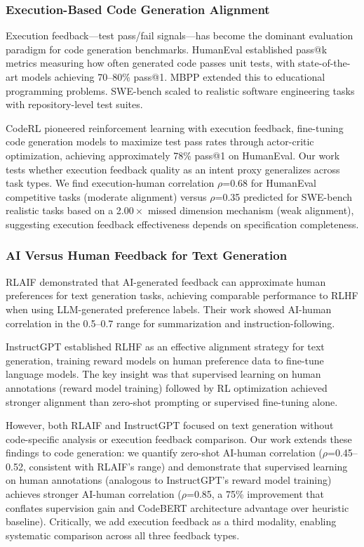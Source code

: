 
\subsubsection{Execution-Based Code Generation Alignment}

Execution feedback---test pass/fail signals---has become the dominant evaluation paradigm for code generation benchmarks. HumanEval \citep{chen2021evaluating} established pass@k metrics measuring how often generated code passes unit tests, with state-of-the-art models achieving 70--80\% pass@1. MBPP \citep{austin2021program} extended this to educational programming problems. SWE-bench \citep{jimenez2023swebench} scaled to realistic software engineering tasks with repository-level test suites.

CodeRL \citep{le2022coderl} pioneered reinforcement learning with execution feedback, fine-tuning code generation models to maximize test pass rates through actor-critic optimization, achieving approximately 78\% pass@1 on HumanEval. Our work tests whether execution feedback quality as an intent proxy generalizes across task types. We find execution-human correlation $\rho$=0.68 for HumanEval competitive tasks (moderate alignment) versus $\rho$=0.35 predicted for SWE-bench realistic tasks based on a 2.$00\times$ missed dimension mechanism (weak alignment), suggesting execution feedback effectiveness depends on specification completeness.

\subsubsection{AI Versus Human Feedback for Text Generation}

RLAIF \citep{lee2023rlaif} demonstrated that AI-generated feedback can approximate human preferences for text generation tasks, achieving comparable performance to RLHF when using LLM-generated preference labels. Their work showed AI-human correlation in the 0.5--0.7 range for summarization and instruction-following.

InstructGPT \citep{ouyang2022training} established RLHF as an effective alignment strategy for text generation, training reward models on human preference data to fine-tune language models. The key insight was that supervised learning on human annotations (reward model training) followed by RL optimization achieved stronger alignment than zero-shot prompting or supervised fine-tuning alone.

However, both RLAIF and InstructGPT focused on text generation without code-specific analysis or execution feedback comparison. Our work extends these findings to code generation: we quantify zero-shot AI-human correlation ($\rho$=0.45--0.52, consistent with RLAIF's range) and demonstrate that supervised learning on human annotations (analogous to InstructGPT's reward model training) achieves stronger AI-human correlation ($\rho$=0.85, a 75\% improvement that conflates supervision gain and CodeBERT architecture advantage over heuristic baseline). Critically, we add execution feedback as a third modality, enabling systematic comparison across all three feedback types.

